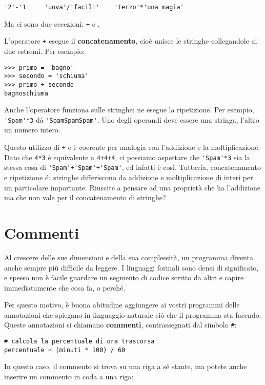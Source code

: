 \documentclass[10pt]{book}
\begin{document}
\begin{verbatim}
'2'-'1'    'uova'/'facili'    'terzo'*'una magia'
\end{verbatim}
%
Ma ci sono due eccezioni: {\tt +} e {\tt *}.

L'operatore {\tt +} esegue il {\bf concatenamento}, cioè unisce le stringhe collegandole ai due estremi. Per esempio:

\begin{verbatim}
>>> primo = 'bagno'
>>> secondo = 'schiuma'
>>> primo + secondo
bagnoschiuma
\end{verbatim}
%

Anche l'operatore {\tt *} funziona sulle stringhe: ne esegue la ripetizione. Per esempio, \verb"'Spam'*3" dà \verb"'SpamSpamSpam'". Uno degli operandi deve essere una stringa, l'altro un numero intero.

Questo utilizzo di {\tt +} e {\tt *} è coerente per analogia con l'addizione e la moltiplicazione. Dato che {\tt 4*3} è equivalente a {\tt 4+4+4}, ci possiamo aspettare che \verb"'Spam'*3" sia la stessa cosa di
\verb"'Spam'+'Spam'+'Spam'", ed infatti è così. Tuttavia, concatenamento e ripetizione di stringhe differiscono da addizione e moltiplicazione di interi per un particolare importante. Riuscite a pensare ad una proprietà che ha l'addizione ma che non vale per il concatenamento di stringhe?


\section{Commenti}

Al crescere delle sue dimensioni e della sua complessità, un programma diventa anche sempre più difficile da leggere. I linguaggi formali sono densi di significato, e spesso non è facile guardare un segmento di codice scritto da altri e capire immediatamente che cosa fa, o perché.

Per questo motivo, è buona abitudine aggiungere ai vostri programmi delle annotazioni che spiegano in linguaggio naturale ciò che il programma sta facendo. Queste annotazioni si chiamano {\bf commenti}, contrassegnati dal simbolo \verb"#":

\begin{verbatim}
# calcola la percentuale di ora trascorsa
percentuale = (minuti * 100) / 60
\end{verbatim}
%
In questo caso, il commento si trova su una riga a sé stante, ma potete anche inserire un commento in coda a una riga:
\end{document}
